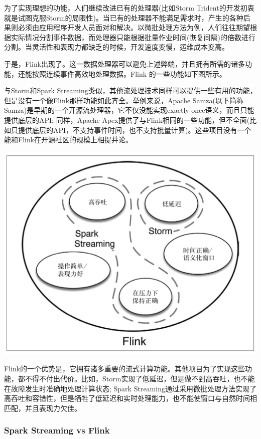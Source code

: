 \documentclass{ctexart}
\begin{document}
为了实现理想的功能，人们继续改进已有的处理器(比如Storm Trident的开发初衷就是试图克服Storm的局限性)。当已有的处理器不能满足需求时，产生的各种后果则必须由应用程序开发人员面对和解决。以微批处理方法为例，人们往往期望根据实际情况分割事件数据，而处理器只能根据批量作业时间(恢复间隔)的倍数进行分割。当灵活性和表现力都缺乏的时候，开发速度变慢，运维成本变高。

于是，Flink出现了。这一数据处理器可以避免上述弊端，并且拥有所需的诸多功能，还能按照连续事件高效地处理数据。Flink 的一些功能如下图所示。

与Storm和Spark Streaming类似，其他流处理技术同样可以提供一些有用的功能，但是没有一个像Flink那样功能如此齐全。举例来说，Apache Samza(以下简称Samza)是早期的一个开源流处理器，它不仅没能实现exactly-once语义，而且只能提供底层的API; 同样，Apache Apex提供了与Flink相同的一些功能，但不全面(比如只提供底层的API，不支持事件时间，也不支持批量计算)。这些项目没有一个能和Flink在开源社区的规模上相提并论。

\includegraphics[width=\textwidth]{flinkvsother.png}

Flink的一个优势是，它拥有诸多重要的流式计算功能。其他项目为了实现这些功能，都不得不付出代价。比如，Storm实现了低延迟，但是做不到高吞吐，也不能在故障发生时准确地处理计算状态; Spark Streaming通过采用微批处理方法实现了高吞吐和容错性，但是牺牲了低延迟和实时处理能力，也不能使窗口与自然时间相匹配，并且表现力欠佳。

\subsubsection{Spark Streaming vs Flink}
\end{document}
